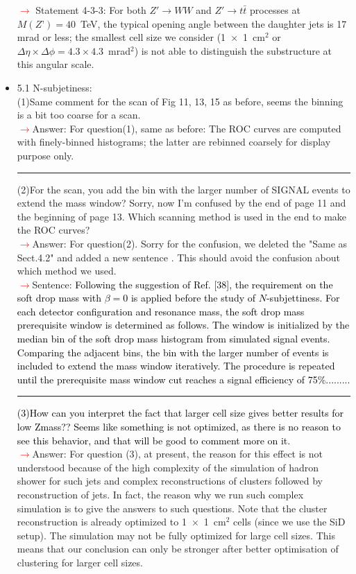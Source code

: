 \documentclass[final,1p,11pt]{elsarticle}
\begin{document}
\begin{itemize}
{ \textcolor{red}{$\rightarrow$} Statement 4-3-3: For both $Z' \to WW$ and $Z' \to t \bar{t}$ processes at $M(Z’) = 40$~TeV, the typical opening angle between the daughter jets 
 is 17 mrad or less; the smallest cell size we consider (1~$\times$~1~cm$^2$ or $\Delta \eta \times \Delta \phi = 4.3 \times 4.3$~mrad$^2$) 
 is not able to distinguish the substructure at this angular scale.}\\
\item 5.1 N-subjetiness: \\
(1)Same comment for the scan of Fig 11, 13, 15 as before, seems the binning is a bit too coarse for a scan.\\ 
 \textcolor{red}{$\rightarrow$}Answer: For question(1), same as before:  The ROC curves are computed with finely-binned histograms; the latter are rebinned coarsely for display purpose only.\\
 \rule{\textwidth}{0.4pt}
(2)For the scan, you add the bin with the larger number of SIGNAL events to extend the mass window? Sorry, now I'm confused by the end of page 11 and the beginning of page 13. Which scanning method is used in the end to make the ROC curves?\\ 
 \textcolor{red}{$\rightarrow$}Answer: For question(2). Sorry for the confusion, we deleted the "Same as Sect.4.2" and added a new sentence . This should avoid the confusion about which method we used.\\
 \textcolor{red}{$\rightarrow$}Sentence: \textcolor{black}{Following the suggestion of Ref. [38], the requirement on the 
soft drop mass with $\beta=0$ is applied before the study of $N$-subjettiness. 
For each detector configuration and resonance mass, the soft drop mass prerequisite window  
is determined as follows. The window is initialized by the median bin of the soft drop 
mass histogram from simulated signal events. Comparing the adjacent bins, the bin with the larger number of events is included to extend the mass window iteratively. The procedure is 
repeated until the prerequisite mass window cut reaches a signal  efficiency of 75\%.........} \\
 \rule{\textwidth}{0.4pt}
\textcolor{black}{(3)How can you interpret the fact that larger cell size gives better results for low Zmass?? Seems like something is not optimized, as there is no reason to see this behavior, and that will be good to comment more on it.}\\
 \textcolor{red}{$\rightarrow$}Answer: For question (3), at present, the reason for this effect is not understood because of the high complexity of the simulation of hadron shower for such jets  and complex reconstructions of clusters followed by reconstruction of jets. In fact, the reason why we run such complex simulation is to give the answers to such questions. Note that the cluster reconstruction is already optimized to 1~$\times$~1~cm$^2$ cells (since we use the SiD setup). The simulation may not be fully optimized for large cell sizes. This means that our conclusion can only be stronger after better optimisation of clustering for larger cell sizes. \\ 
\end{itemize}
\end{document}
